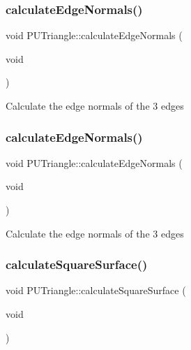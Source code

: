 \subsubsection{\texorpdfstring{calculate\+Edge\+Normals()}{calculateEdgeNormals()}\hspace{0.1cm}{\footnotesize\ttfamily [1/2]}}
{\footnotesize\ttfamily void P\+U\+Triangle\+::calculate\+Edge\+Normals (\begin{DoxyParamCaption}\item[{void}]{ }\end{DoxyParamCaption})\hspace{0.3cm}{\ttfamily [inline]}}

Calculate the edge normals of the 3 edges \mbox{\label{classPUTriangle_a29ed7c93b87e3b348057d30c088157b2}} 
\subsubsection{\texorpdfstring{calculate\+Edge\+Normals()}{calculateEdgeNormals()}\hspace{0.1cm}{\footnotesize\ttfamily [2/2]}}
{\footnotesize\ttfamily void P\+U\+Triangle\+::calculate\+Edge\+Normals (\begin{DoxyParamCaption}\item[{void}]{ }\end{DoxyParamCaption})}

Calculate the edge normals of the 3 edges \mbox{\label{classPUTriangle_a346b241c7794e565c33876f0dded6d46}} 
\subsubsection{\texorpdfstring{calculate\+Square\+Surface()}{calculateSquareSurface()}\hspace{0.1cm}{\footnotesize\ttfamily [1/2]}}
{\footnotesize\ttfamily void P\+U\+Triangle\+::calculate\+Square\+Surface (\begin{DoxyParamCaption}\item[{void}]{ }\end{DoxyParamCaption})\hspace{0.3cm}{\ttfamily [inline]}}

